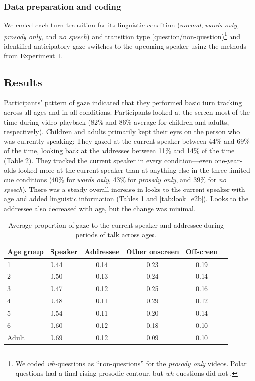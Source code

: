 \documentclass[authoryear, 12pt]{elsarticle}
\begin{document}
\subsubsection{Data preparation and coding}
We coded each turn transition for its linguistic condition (\textit{normal}, \textit{words only}, \textit{prosody only}, and \textit{no speech}) and transition type (question/non-question)\footnote{We coded \textit{wh-}questions as ``non-questions'' for the \textit{prosody only} videos. Polar questions had a final rising prosodic contour, but \textit{wh-}questions did not  \citep{hedberg2010}.} and identified anticipatory gaze switches to the upcoming speaker using the methods from Experiment 1.

\subsection{Results}
\label{sec:results2}

Participants' pattern of gaze indicated that they performed basic turn tracking across all ages and in all conditions. Participants looked at the screen most of the time during video playback (82\% and 86\% average for children and adults, respectively). Children and adults primarily kept their eyes on the person who was currently speaking: They gazed at the current speaker between 44\% and 69\% of the time, looking back at the addressee between 11\% and 14\% of the time (Table 2). They tracked the current speaker in every condition---even one-year-olds looked more at the current speaker than at anything else in the three limited cue conditions (40\% for \textit{words only}, 43\% for \textit{prosody only}, and 39\% for \textit{no speech}). There was a steady overall increase in looks to the current speaker with age and added linguistic information (Tables \ref{tab:look_e2} and \ref{tab:look_e2b}). Looks to the addressee also decreased with age, but the change was minimal. 

\begin{table}[h]
\begin{center}
  \begin{tabular}{llcccc}
    \hline
    Age group & Speaker & Addressee & Other onscreen & Offscreen\\ 
    \hline
    1 & 0.44 & 0.14 & 0.23 & 0.19 \\ 
    2 & 0.50 & 0.13 & 0.24 & 0.14 \\ 
    3 & 0.47 & 0.12 & 0.25 & 0.16 \\ 
    4 & 0.48 & 0.11 & 0.29 & 0.12 \\ 
    5 & 0.54 & 0.11 & 0.20 & 0.14 \\ 
    6 & 0.60 & 0.12 & 0.18 & 0.10 \\
    Adult & 0.69 & 0.12 & 0.09 & 0.10 \\
    \hline
  \end{tabular}
\end{center}
  \caption{Average proportion of gaze to the current speaker and addressee during periods of talk across ages.}
\label{tab:look_e2}
\end{table}
\end{document}
